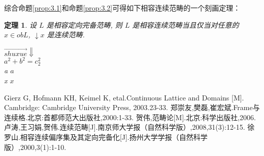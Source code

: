 \documentclass[c5size,a4paper,hyperref,fancyhdr,UTF8]{ctexart}
\theoremstyle{nonumberplain}
\newtheorem{theorem}[definition]{定理}
\theoremstyle{nonumberplain}
\begin{document}
综合命题\ref{prop:3.1}和命题\ref{prop:3.2}可得如下相容连续范畴的一个刻画定理：

\begin{theorem}
    设 $L$ 是相容定向完备范畴, 则 $L$ 是相容连续范畴当且仅当对任意的 $x\in obL$, $\downarrow x$ 是连续范畴.

    $\overrightarrow{shuxue}  \Downarrow$\\
    \indent $a^{2}+b^{2}=c_{2}^{2}$\\
    \indent a   $a$\\
    \indent x   $x$
\end{theorem}

\begin{thebibliography}{000}

   Gierz G, Hofmann KH, Keimel K, etal.Continuous Lattice and Domains [M]. Cambridge: Cambridge University Press, 2003.23-33.
   郑崇友,樊磊,崔宏斌.Frame与连续格.北京:首都师范大出版社,2000:1-33.
   贺伟,范畴论[M].北京:科学出版社,2006.
   卢涛,王习娟,贺伟.连续范畴[J].南京师大学报（自然科学版）,2008,31(3):12-15.
   徐罗山.相容连续偏序集及其定向完备化[J].扬州大学学报（自然科学版）,2000,3(1):1-10.
\end{thebibliography}
\end{document}
